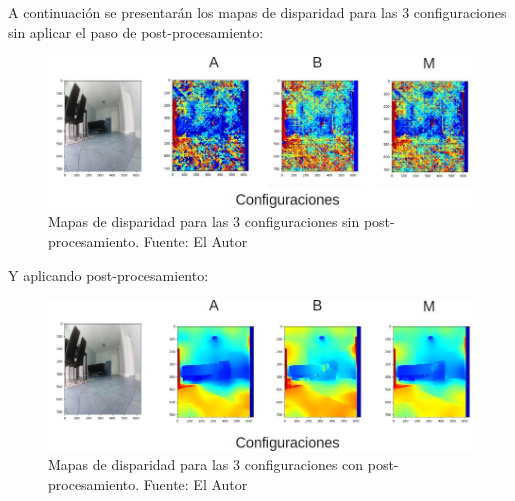 A continuación se presentarán los mapas de disparidad para las 3 configuraciones sin aplicar el paso de post-procesamiento:
\begin{figure}[H]
    \centering
    \includegraphics[scale=0.6]{Recursos/disparity_maps_without_postprocessing_results.jpg}
    \caption[Mapas de disparidad para las 3 configuraciones sin post-procesamiento.]{Mapas de disparidad para las 3 configuraciones sin post-procesamiento. {\footnotesize Fuente: El Autor}}
    \label{disparity_without_postprocess}
\end{figure}
Y aplicando post-procesamiento:
\begin{figure}[H]
    \centering
    \includegraphics[scale=0.6]{Recursos/disparity_maps_with_postprocessing_results.jpg}
    \caption[Mapas de disparidad para las 3 configuraciones con post-procesamiento.]{Mapas de disparidad para las 3 configuraciones con post-procesamiento. {\footnotesize Fuente: El Autor}}
    \label{disparity_with_postprocess}
\end{figure}

